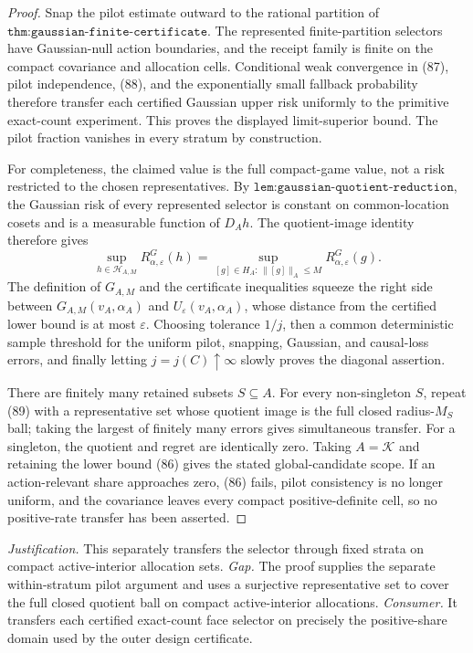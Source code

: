 \documentclass{article}
\begin{document}
\begin{proof}
Snap the pilot estimate outward to the rational partition of \(\texttt{thm:gaussian-finite-certificate}\).  The represented finite-partition selectors have Gaussian-null action boundaries, and the receipt family is finite on the compact covariance and allocation cells.  Conditional weak convergence in (87), pilot independence, (88), and the exponentially small fallback probability therefore transfer each certified Gaussian upper risk uniformly to the primitive exact-count experiment.  This proves the displayed limit-superior bound.  The pilot fraction vanishes in every stratum by construction.

For completeness, the claimed value is the full compact-game value, not a risk restricted to the chosen representatives.  By \(\texttt{lem:gaussian-quotient-reduction}\), the Gaussian risk of every represented selector is constant on common-location cosets and is a measurable function of \(D_Ah\).  The quotient-image identity therefore gives
\[
\sup_{h\in\mathscr H_{A,M}}R_{\alpha,\varepsilon}^G(h)
=\sup_{[g]\in H_A:\,\lVert[g]\rVert_A\leq M}
  R_{\alpha,\varepsilon}^G(g).                                  \tag{89}
\]
The definition of \(G_{A,M}\) and the certificate inequalities squeeze the right side between \(G_{A,M}(v_A,\alpha_A)\) and \(U_\varepsilon(v_A,\alpha_A)\), whose distance from the certified lower bound is at most \(\varepsilon\).  Choosing tolerance \(1/j\), then a common deterministic sample threshold for the uniform pilot, snapping, Gaussian, and causal-loss errors, and finally letting \(j=j(C)\uparrow\infty\) slowly proves the diagonal assertion.

There are finitely many retained subsets \(S\subseteq A\).  For every non-singleton \(S\), repeat (89) with a representative set whose quotient image is the full closed radius-\(M_S\) ball; taking the largest of finitely many errors gives simultaneous transfer.  For a singleton, the quotient and regret are identically zero.  Taking \(A=\mathcal K\) and retaining the lower bound (86) gives the stated global-candidate scope.  If an action-relevant share approaches zero, (86) fails, pilot consistency is no longer uniform, and the covariance leaves every compact positive-definite cell, so no positive-rate transfer has been asserted.
\end{proof}
\par\smallskip\noindent \textit{Justification.} This separately transfers the selector through fixed strata on compact active-interior allocation sets. \textit{Gap.} The proof supplies the separate within-stratum pilot argument and uses a surjective representative set to cover the full closed quotient ball on compact active-interior allocations. \textit{Consumer.} It transfers each certified exact-count face selector on precisely the positive-share domain used by the outer design certificate.
\end{document}
